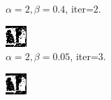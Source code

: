 \documentclass{article}
\begin{document}
\begin{figure}[t]
\begin{subfigure}[t]{0.27\textwidth}
  \vspace{-0.6cm}
  \caption{$\alpha=2, \beta=0.4$, iter=$2$.}
\end{subfigure}
\begin{subfigure}[t]{0.27\textwidth}
  \centering
  \includegraphics[width=\textwidth]{iii_alpha_2_beta_0.05_iterations_4.bmp}
  \vspace{-0.6cm}
  \caption{$\alpha=2, \beta=0.05$, iter=$3$.}
\end{subfigure}
\begin{subfigure}[t]{0.27\textwidth}
  \centering
  \includegraphics[width=\textwidth]{iii_alpha_2_beta_0.2_iterations_4.bmp}

\end{subfigure}
\end{figure}
\end{document}
